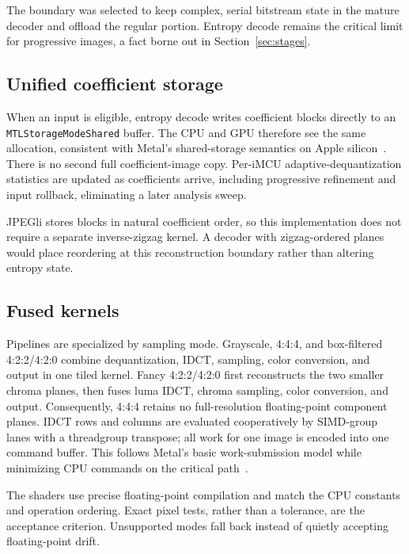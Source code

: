 \documentclass[10pt,twocolumn]{article}
\newcommand{\code}[1]{\texttt{#1}}
\begin{document}
The boundary was selected to keep complex, serial bitstream state in the
mature decoder and offload the regular portion.  Entropy decode remains the
critical limit for progressive images, a fact borne out in
Section~\ref{sec:stages}.

\subsection{Unified coefficient storage}

When an input is eligible, entropy decode writes coefficient blocks directly
to an \code{MTLStorageModeShared} buffer.  The CPU and GPU therefore see the
same allocation, consistent with Metal's shared-storage semantics on Apple
silicon~\cite{apple-shared-storage,apple-unified-memory}.  There is no second
full coefficient-image copy.  Per-iMCU adaptive-dequantization statistics are
updated as coefficients arrive, including progressive refinement and input
rollback, eliminating a later analysis sweep.

JPEGli stores blocks in natural coefficient order, so this implementation does
not require a separate inverse-zigzag kernel.  A decoder with zigzag-ordered
planes would place reordering at this reconstruction boundary rather than
altering entropy state.

\subsection{Fused kernels}

Pipelines are specialized by sampling mode.  Grayscale, 4:4:4, and
box-filtered 4:2:2/4:2:0 combine dequantization, IDCT, sampling, color
conversion, and output in one tiled kernel.  Fancy 4:2:2/4:2:0 first
reconstructs the two smaller chroma planes, then fuses luma IDCT, chroma
sampling, color conversion, and output.  Consequently, 4:4:4 retains no
full-resolution floating-point component planes.  IDCT rows and columns are
evaluated cooperatively by SIMD-group lanes with a threadgroup transpose; all
work for one image is encoded into one command buffer.  This follows Metal's
basic work-submission model while minimizing CPU commands on the critical
path~\cite{apple-metal-calculation,apple-command-structure}.

The shaders use precise floating-point compilation and match the CPU
constants and operation ordering.  Exact pixel tests, rather than a tolerance,
are the acceptance criterion.  Unsupported modes fall back instead of
quietly accepting floating-point drift.
\end{document}
